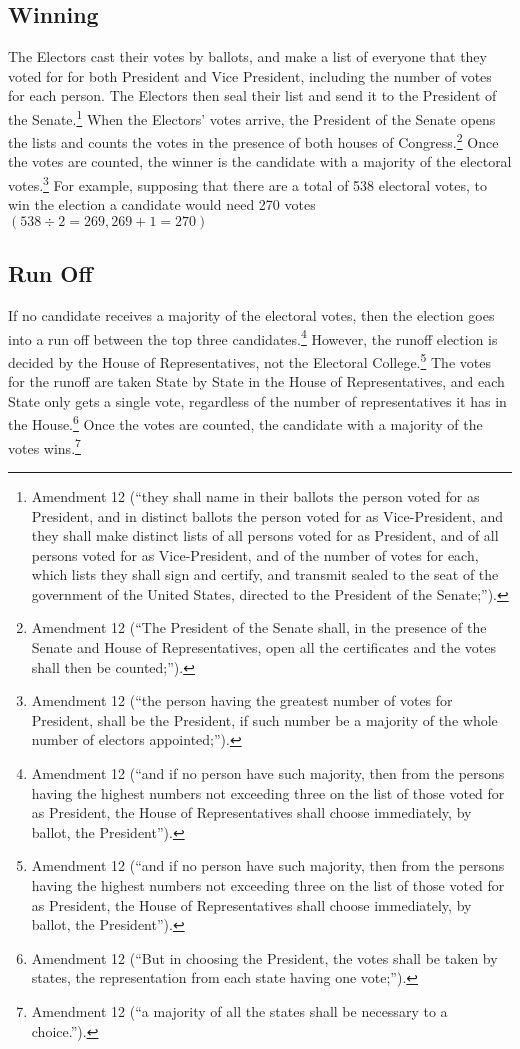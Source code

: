 \subsection{Winning}
The Electors cast their votes by ballots, and make a list of everyone that they voted for for both President and Vice President, including the number of votes for each person.  The Electors then seal their list and send it to the President of the Senate.\footnote{Amendment 12 (``they shall name in their ballots the person voted for as President, and in distinct ballots the person voted for as Vice-President, and they shall make distinct lists of all persons voted for as President, and of all persons voted for as Vice-President, and of the number of votes for each, which lists they shall sign and certify, and transmit sealed to the seat of the government of the United States, directed to the President of the Senate;'').}
When the Electors' votes arrive, the President of the Senate opens the lists and counts the votes in the presence of both houses of Congress.\footnote{Amendment 12 (``The President of the Senate shall, in the presence of the Senate and House of Representatives, open all the certificates and the votes shall then be counted;'').}
Once the votes are counted, the winner is the candidate with a majority of the electoral votes.\footnote{Amendment 12 (``the person having the greatest number of votes for President, shall be the President, if such number be a majority of the whole number of electors appointed;'').}
For example, supposing that there are a total of 538 electoral votes, to win the election a candidate would need 270 votes 
\begin{math}
(538 \div 2 = 269, 269 + 1 = 270)
\end{math}

\subsection{Run Off}
If no candidate receives a majority of the electoral votes, then the election goes into a run off between the top three candidates.\footnote{Amendment 12 (``and if no person have such majority, then from the persons having the highest numbers not exceeding three on the list of those voted for as President, the House of Representatives shall choose immediately, by ballot, the President'').}  However, the runoff election is decided by the House of Representatives, not the Electoral College.\footnote{Amendment 12 (``and if no person have such majority, then from the persons having the highest numbers not exceeding three on the list of those voted for as President, the House of Representatives shall choose immediately, by ballot, the President'').}
The votes for the runoff are taken State by State in the House of Representatives, and each State only gets a single vote, regardless of the number of representatives it has in the House.\footnote{Amendment 12 (``But in choosing the President, the votes shall be taken by states, the representation from each state having one vote;'').}
Once the votes are counted, the candidate with a majority of the votes wins.\footnote{Amendment 12 (``a majority of all the states shall be necessary to a choice.'').}


